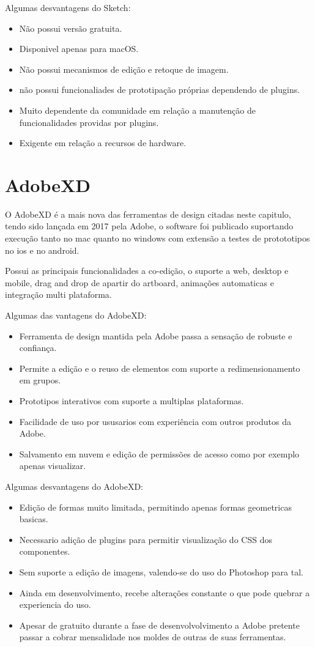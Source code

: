Algumas desvantagens do Sketch:
\begin{itemize}
  \item Não possui versão gratuita.
  \item Disponivel apenas para macOS.
  \item Não possui mecanismos de edição e retoque de imagem.
  \item não possui funcionaliades de prototipação próprias dependendo de plugins.
  \item Muito dependente da comunidade em relação a manutenção de funcionalidades providas por plugins.
  \item Exigente em relação a recursos de hardware.
\end{itemize}

\section{AdobeXD} \label{AdobeXD}

O AdobeXD é a mais nova das ferramentas de design citadas neste capitulo, tendo sido lançada em 2017 pela Adobe, o software foi publicado suportando execução tanto no mac quanto no windows com extensão a testes de protototipos no ios e no android.

Possui as principais funcionalidades a co-edição, o suporte a web, desktop e mobile, drag and drop de apartir do artboard, animações automaticas e integração multi plataforma.

Algumas das vantagens do AdobeXD:
\begin{itemize}
  \item Ferramenta de design mantida pela Adobe passa a sensação de robuste e confiança.
  \item Permite a edição e o reuso de elementos com suporte a redimensionamento em grupos.
  \item Prototipos interativos com suporte a multiplas plataformas.
  \item Facilidade de uso por ususarios com experiência com outros produtos da Adobe.
  \item Salvamento em nuvem e edição de permissões de acesso como por exemplo apenas visualizar.
\end{itemize}

Algumas desvantagens do AdobeXD:
\begin{itemize}
  \item Edição de formas muito limitada, permitindo apenas formas geometricas basicas.
  \item Necessario adição de plugins para permitir visualização do CSS dos componentes.
  \item Sem suporte a edição de imagens, valendo-se do uso do Photoshop para tal.
  \item Ainda em desenvolvimento, recebe alterações constante o que pode quebrar a experiencia do uso.
  \item Apesar de gratuito durante a fase de desenvolvolvimento a Adobe pretente passar a cobrar mensalidade nos moldes de outras de suas ferramentas.
\end{itemize}

